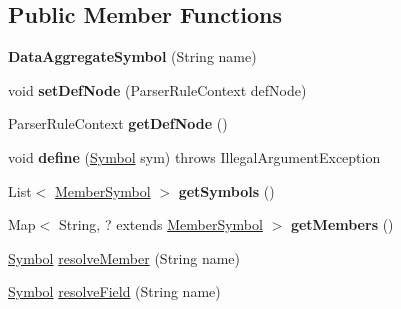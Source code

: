 \subsection*{Public Member Functions}
\begin{DoxyCompactItemize}
\item 
\mbox{\label{classlime_1_1antlr4_1_1DataAggregateSymbol_af5bc2cbf9f55353c0f3c4dfe68b37264}} 
{\bfseries Data\+Aggregate\+Symbol} (String name)
\item 
\mbox{\label{classlime_1_1antlr4_1_1DataAggregateSymbol_aa5b40e0ac8e54021bd945bb4a540bb87}} 
void {\bfseries set\+Def\+Node} (Parser\+Rule\+Context def\+Node)
\item 
\mbox{\label{classlime_1_1antlr4_1_1DataAggregateSymbol_a9192b34aa0bfb8bf9fb557146758c50e}} 
Parser\+Rule\+Context {\bfseries get\+Def\+Node} ()
\item 
\mbox{\label{classlime_1_1antlr4_1_1DataAggregateSymbol_a801c13da5a9071f36d74644f342fc927}} 
void {\bfseries define} (\hyperlink{interfacelime_1_1antlr4_1_1Symbol}{Symbol} sym)  throws Illegal\+Argument\+Exception 
\item 
\mbox{\label{classlime_1_1antlr4_1_1DataAggregateSymbol_ad9a13cb3e8f8397e980c8ad352cceb4f}} 
List$<$ \hyperlink{interfacelime_1_1antlr4_1_1MemberSymbol}{Member\+Symbol} $>$ {\bfseries get\+Symbols} ()
\item 
\mbox{\label{classlime_1_1antlr4_1_1DataAggregateSymbol_aae39240cecab418ac71f51bd7404c4eb}} 
Map$<$ String, ? extends \hyperlink{interfacelime_1_1antlr4_1_1MemberSymbol}{Member\+Symbol} $>$ {\bfseries get\+Members} ()
\item 
\hyperlink{interfacelime_1_1antlr4_1_1Symbol}{Symbol} \hyperlink{classlime_1_1antlr4_1_1DataAggregateSymbol_a59dd410b45c3761c12cff84c2bdb5a58}{resolve\+Member} (String name)
\item 
\hyperlink{interfacelime_1_1antlr4_1_1Symbol}{Symbol} \hyperlink{classlime_1_1antlr4_1_1DataAggregateSymbol_a0a1d90d6144f8c30e7733af041cc46f2}{resolve\+Field} (String name)

\end{DoxyCompactItemize}
